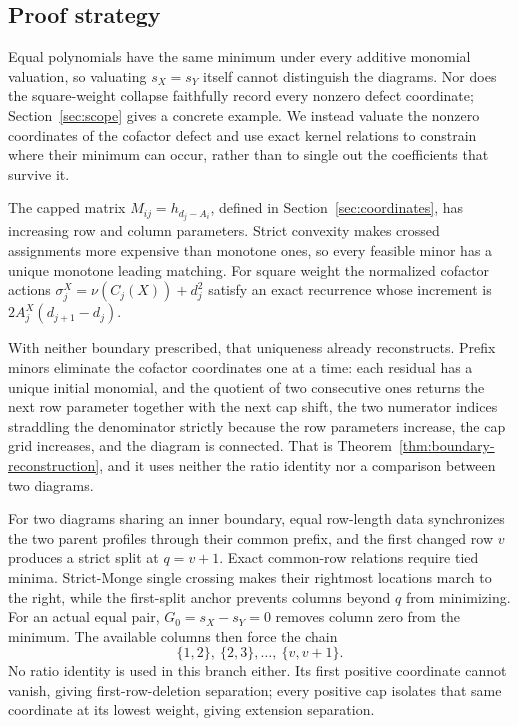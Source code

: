 \documentclass[11pt,a4paper]{amsart}
\numberwithin{equation}{section}
\theoremstyle{plain}
\theoremstyle{definition}
\newcommand{\wt}{\nu}
\begin{document}
\subsection{Proof strategy}

Equal polynomials have the same minimum under every additive monomial
valuation, so valuating \(s_X=s_Y\) itself cannot distinguish the diagrams.
Nor does the square-weight collapse faithfully record every nonzero defect
coordinate; Section~\ref{sec:scope} gives a concrete example.  We instead
valuate the nonzero coordinates of the cofactor defect and use exact
kernel relations to constrain where their minimum can occur, rather than to
single out the coefficients that survive it.

The capped matrix \(M_{ij}=h_{d_j-A_i}\),
defined in Section~\ref{sec:coordinates}, has increasing row and column
parameters.  Strict convexity makes crossed assignments more expensive than
monotone ones, so every feasible minor has a unique monotone leading
matching.  For square weight the normalized cofactor actions
\(\sigma_j^X=\wt(C_j(X))+d_j^2\) satisfy an exact recurrence whose increment is
\(2A_j^X(d_{j+1}-d_j)\).

With neither boundary prescribed, that uniqueness already reconstructs.
Prefix minors eliminate the cofactor coordinates one at a time: each residual
has a unique initial monomial, and the quotient of two consecutive ones
returns the next row parameter together with the next cap shift, the two
numerator indices straddling the denominator strictly because the row
parameters increase, the cap grid increases, and the diagram is connected.
That is Theorem~\ref{thm:boundary-reconstruction}, and it uses neither the
ratio identity nor a comparison between two diagrams.

For two diagrams sharing an inner boundary, equal row-length data synchronizes
the two parent profiles through their common prefix, and the first changed row
\(v\) produces a strict split at \(q=v+1\).
Exact common-row relations require tied minima.  Strict-Monge single
crossing makes their rightmost locations march to the right, while the
first-split anchor prevents columns beyond \(q\) from minimizing.  For an
actual equal pair, \(G_0=s_X-s_Y=0\) removes column zero from the minimum.
The available columns then force the chain
\begin{equation}\label{eq:edge-chain-intro}
\{1,2\},\ \{2,3\},\ldots,\ \{v,v+1\}.
\end{equation}
No ratio identity is used in this branch either.  Its first positive
coordinate cannot vanish, giving first-row-deletion separation; every
positive cap isolates that same coordinate at its lowest weight, giving
extension separation.
\end{document}
